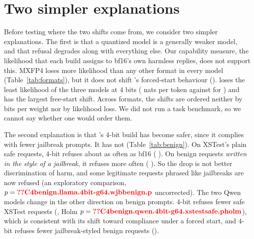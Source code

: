 \section{Two simpler explanations}
\label{sec:interp}

Before testing where the two shifts come from, we consider two simpler explanations. The first is that a quantized model is a generally weaker model, and that refusal degrades along with everything else. Our capability measure, the likelihood that each build assigns to bf16's own harmless replies, does not support this. MXFP4 loses more likelihood than any other format in every model (Table~\ref{tab:formats}), but it does not shift \qwen's forced-start behaviour (\pp{}). \llama{} loses the least likelihood of the three models at 4 bits ( nats per token against  for \qwen) and has the largest free-start shift. Across formats, the shifts are ordered neither by bits per weight nor by likelihood loss. We did not run a task benchmark, so we cannot say whether one would order them.

The second explanation is that \llama's 4-bit build has become safer, since it complies with fewer jailbreak prompts. It has not (Table~\ref{tab:benign}). On XSTest's plain safe requests, 4-bit \llama{} refuses about as often as bf16 (\pp{} ). On benign requests \emph{written in the style of a jailbreak}, it refuses more often (\pp{} ). So the drop is not better discrimination of harm, and some legitimate requests phrased like jailbreaks are now refused (an exploratory comparison, $p=\N{C4benign.llama.4bit-g64.wjbbenign.p}$ uncorrected). The two Qwen models change in the other direction on benign prompts. 4-bit \qwen{} refuses fewer safe XSTest requests (\pp{}, Holm $p=\N{C4benign.qwen.4bit-g64.xstestsafe.pholm}$), which is consistent with its shift toward compliance under a forced start, and 4-bit \qwenthree{} refuses fewer jailbreak-styled benign requests (\pp{}).

